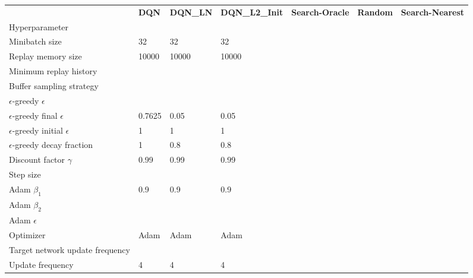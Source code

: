 \begin{tabular}{lllllll}
 & \bfseries DQN & \bfseries DQN_LN & \bfseries DQN_L2_Init & \bfseries Search-Oracle & \bfseries Random & \bfseries Search-Nearest \\
Hyperparameter &  &  &  &  &  &  \\
Minibatch size & 32 & 32 & 32 &  &  &  \\
Replay memory size & 10000 & 10000 & 10000 &  &  &  \\
Minimum replay history &  &  &  &  &  &  \\
Buffer sampling strategy &  &  &  &  &  &  \\
$\epsilon$-greedy $\epsilon$ &  &  &  &  &  &  \\
$\epsilon$-greedy final $\epsilon$ & 0.7625 & 0.05 & 0.05 &  &  &  \\
$\epsilon$-greedy initial $\epsilon$ & 1 & 1 & 1 &  &  &  \\
$\epsilon$-greedy decay fraction & 1 & 0.8 & 0.8 &  &  &  \\
Discount factor $\gamma$ & 0.99 & 0.99 & 0.99 &  &  &  \\
Step size &  &  &  &  &  &  \\
Adam $\beta_1$ & 0.9 & 0.9 & 0.9 &  &  &  \\
Adam $\beta_2$ &  &  &  &  &  &  \\
Adam $\epsilon$ &  &  &  &  &  &  \\
Optimizer & Adam & Adam & Adam &  &  &  \\
Target network update frequency &  &  &  &  &  &  \\
Update frequency & 4 & 4 & 4 &  &  &  \\
\end{tabular}
